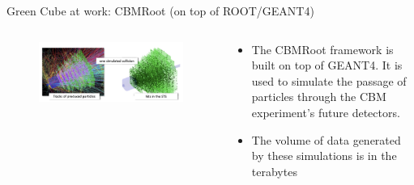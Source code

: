 \begin{frame}[fragile]{Green Cube at work: CBMRoot (on top of ROOT/GEANT4)}
    \begin{columns}
        \begin{column}{0.6\textwidth}
            \begin{figure}
                \centering
                \includegraphics[width=\textwidth]{images/sts_reco.png}
            \end{figure}
        \end{column}
        \begin{column}{0.4\textwidth}
            \begin{itemize}
                \item The CBMRoot framework is built on top of GEANT4. It is used to simulate the passage of particles
                      through the CBM experiment's future detectors.
                \item The volume of data generated by these simulations is in the terabytes
            \end{itemize}
        \end{column}
    \end{columns}
\end{frame}

